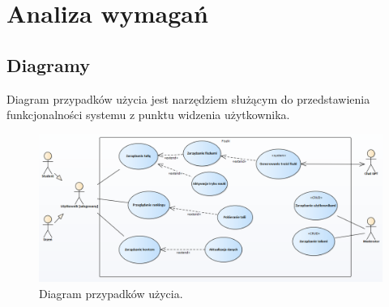 \newpage
\chapter{Analiza wymagań}

\section{Diagramy}

\begin{minipage}{\textwidth}
\setlength{\parindent}{15pt}

\indent Diagram przypadków użycia jest narzędziem służącym do przedstawienia funkcjonalności systemu z punktu widzenia użytkownika.

\begin{figure}[H]
    \centering
    \includegraphics[width=1\textwidth]{chapters/chapter_6/diagram_przypadkow_uzycia}
    \caption{Diagram przypadków użycia.}
    \label{img:diagram_przypadkow_uzycia}
\end{figure}

\end{minipage}

